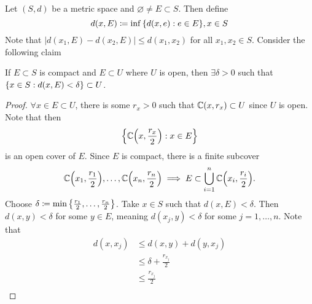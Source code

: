 \documentclass[../notes.tex]{subfiles}
\begin{document}
\begin{example}
    Let $(S,d)$ be a metric space and $\varnothing \neq E \subset S$. Then define
    \[
        d(x, E) \coloneq \inf\qty{d(x,e) : e \in E}, x \in S
    \]
    Note that $|d(x_1, E) - d(x_2, E)| \leq d(x_1, x_2)$ for all $x_1,x_2 \in S$. Consider the following claim
    \begin{theorem}
        If $E \subset S$ is compact and $E \subset U$ where $U$ is open, then $\exists \delta > 0$ such that $\qty{x \in S : d(x,E) < \delta} \subset U$.
    \end{theorem}
    \begin{proof}
        $\forall x \in E \subset U$, there is some $r_x > 0$ such that $\mathbb{C}\qty(x,r_x) \subset U$ since $U$ is open. Note that then
        \[
            \qty{\mathbb{C}\qty(x,\frac{r_x}{2}) : x \in E}
        \]
        is an open cover of $E$. Since $E$ is compact, there is a finite subcover
        \[
            \mathbb{C}\qty(x_1, \frac{r_1}{2}), \ldots, \mathbb{C}\qty(x_n, \frac{r_n}{2}) \implies E \subset \bigcup_{i = 1}^n \mathbb{C}\qty(x_i, \frac{r_i}{2})
        .\]
        Choose $\delta \coloneq \min\qty{\frac{r_1}{2}, \ldots, \frac{r_n}{2}}$. Take $x \in S$ such that $d(x,E) < \delta$. Then $d(x,y) < \delta$ for some $y \in E$, meaning $d(x_j, y) < \delta$ for some $j = 1,\ldots,n$. Note that
        \begin{align*}
            d(x, x_j) &\leq d(x,y) + d(y, x_j) \\
                      &\leq \delta + \frac{r_{x_j}}{2} \\
                      &\leq \frac{r_{x_j}}{2} \\
        \end{align*}
    \end{proof}
\end{example}
\end{document}
